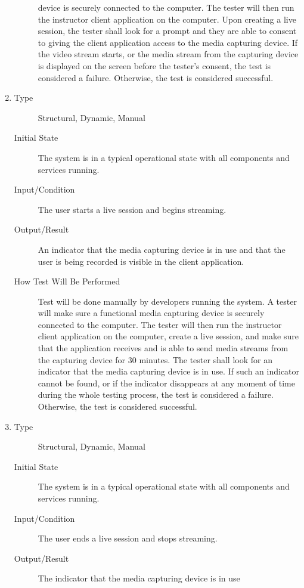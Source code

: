 \documentclass[12pt, titlepage]{article}
\begin{document}
\begin{enumerate}[NFR-T1]
\begin{description}
    device is securely connected to the computer. The tester will then run the
    instructor client application on the computer. Upon creating a live session,
    the tester shall look for a prompt and they are able to consent to giving
    the client application access to the media capturing device. If the video
    stream starts, or the media stream from the capturing device is displayed on
    the screen before the tester’s consent, the test is considered a failure.
    Otherwise, the test is considered successful.
  \end{description}
\item \label{NFRT25}
  \begin{description}
  \item[Type] Structural, Dynamic, Manual
  \item[Initial State] The system is in a typical operational state with all
    components and services running.
  \item[Input/Condition] The user starts a live session and begins streaming.
  \item[Output/Result] An indicator that the media capturing device is in use
    and that the user is being recorded is visible in the client application.
  \item[How Test Will Be Performed] Test will be done manually by developers
    running the system. A tester will make sure a functional media capturing
    device is securely connected to the computer. The tester will then run the
    instructor client application on the computer, create a live session, and
    make sure that the application receives and is able to send media streams
    from the capturing device for 30 minutes. The tester shall look for an
    indicator that the media capturing device is in use. If such an indicator
    cannot be found, or if the indicator disappears at any moment of time during
    the whole testing process, the test is considered a failure. Otherwise, the
    test is considered successful.
  \end{description}
\item \label{NFRT26}
  \begin{description}
  \item[Type] Structural, Dynamic, Manual
  \item[Initial State] The system is in a typical operational state with all
    components and services running.
  \item[Input/Condition] The user ends a live session and stops streaming.
  \item[Output/Result] The indicator that the media capturing device is in use

\end{description}
\end{enumerate}
\end{document}
